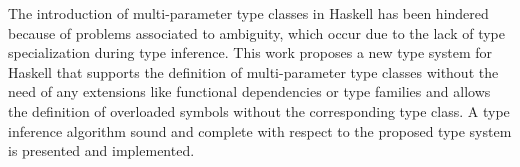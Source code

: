The introduction of multi-parameter type classes in Haskell has been
hindered because of problems associated to ambiguity, which occur due
to the lack of type specialization during type inference. This work proposes a new
type system for Haskell that supports the definition of multi-parameter
type classes without the need of any extensions like functional dependencies or 
type families and allows the definition of overloaded symbols without the corresponding type class. 
A type inference algorithm sound and complete with respect to the proposed type system is presented and implemented.